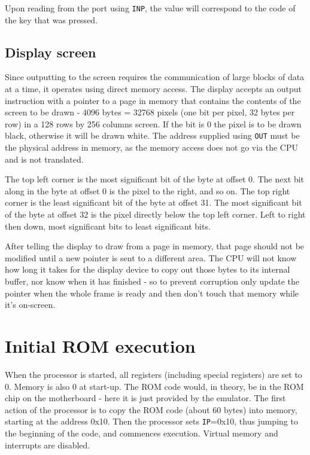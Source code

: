 \documentclass[12pt,a4paper]{report}
\begin{document}
Upon reading from the port using \texttt{INP}, the value will correspond to the code of the key that was pressed.

\subsection*{Display screen} \label{display}

Since outputting to the screen requires the communication of large blocks of data at a time, it operates using direct memory access. The display accepts an output instruction with a pointer to a page in memory that contains the contents of the screen to be drawn - 4096 bytes = 32768 pixels (one bit per pixel, 32 bytes per row) in a 128 rows by 256 columns screen. If the bit is 0 the pixel is to be drawn black, otherwise it will be drawn white. The address supplied using \texttt{OUT} must be the physical address in memory, as the memory access does not go via the CPU and is not translated.

The top left corner is the most significant bit of the byte at offset 0. The next bit along in the byte at offset 0 is the pixel to the right, and so on. The top right corner is the least significant bit of the byte at offset 31. The most significant bit of the byte at offset 32 is the pixel directly below the top left corner. Left to right then down, most significant bits to least significant bits.

After telling the display to draw from a page in memory, that page should not be modified until a new pointer is sent to a different area. The CPU will not know how long it takes for the display device to copy out those bytes to its internal buffer, nor know when it has finished - so to prevent corruption only update the pointer when the whole frame is ready and then don't touch that memory while it's on-screen.

\section{Initial ROM execution}

When the processor is started, all registers (including special registers) are set to 0. Memory is also 0 at start-up. The ROM code would, in theory, be in the ROM chip on the motherboard - here it is just provided by the emulator. The first action of the processor is to copy the ROM code (about 60 bytes) into memory, starting at the address 0x10. Then the processor sets \texttt{IP}=0x10, thus jumping to the beginning of the code, and commences execution. Virtual memory and interrupts are disabled.
\end{document}
